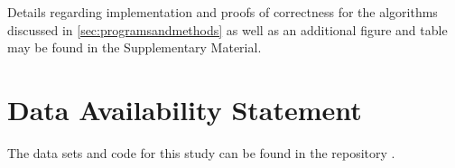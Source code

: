 Details regarding implementation and proofs of correctness for the algorithms discussed in \se \ref{sec:programsandmethods} as well as an additional figure and table may be found in the Supplementary Material.


\section{Data Availability Statement}
The data sets and code for this study can be found in the repository \cite{li_thompson}.




